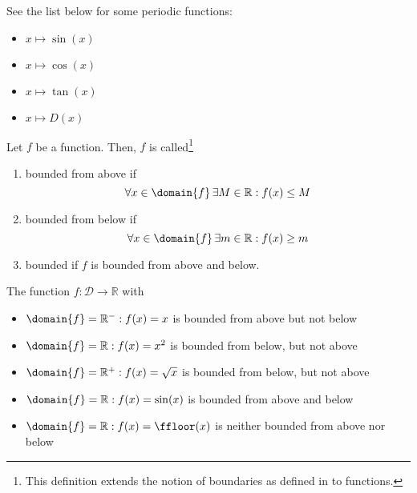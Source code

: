 \begin{exm}
	See the list below for some periodic functions:
	\begin{itemize}
		\item $x\mapsto\sin(x)$
		\item $x\mapsto\cos(x)$
		\item $x\mapsto\tan(x)$
		\item \hyperref[def-dirichlet-function]{$x\mapsto D(x)$}
	\end{itemize}
\end{exm}

\begin{definition}\label{def-bounded-function}
	Let $f$ be a function. Then, $f$ is called\footnote{This definition extends
		the notion of boundaries as defined in  to
		functions.}
	\begin{enumerate}
		\item bounded from above if
		      \begin{equation}
			      \forall x\in\domain{f}\,\exists M\in\mathbb{R}:f(x)\leq M
		      \end{equation}
		\item bounded from below if
		      \begin{equation}
			      \forall x\in\domain{f}\,\exists m\in\mathbb{R}:f(x)\geq m
		      \end{equation}
		\item bounded if $f$ is bounded from above and below.
	\end{enumerate}
\end{definition}

\begin{exm}
	The function $f:\mathcal{D}\to\mathbb{R}$ with
	\begin{itemize}
		\item $\domain{f}=\mathbb{R}^-:f(x)=x$ is bounded from above but not below
		\item $\domain{f}=\mathbb{R}:f(x)=x^2$ is bounded from below, but not above
		\item $\domain{f}=\mathbb{R}^+:f(x)=\sqrt{x}$ is bounded from below, but not above
		\item $\domain{f}=\mathbb{R}:f(x)=\sin(x)$ is bounded from above and below
		\item $\domain{f}=\mathbb{R}:f(x)=\ffloor(x)$ is neither bounded from above nor below
	\end{itemize}
\end{exm}

